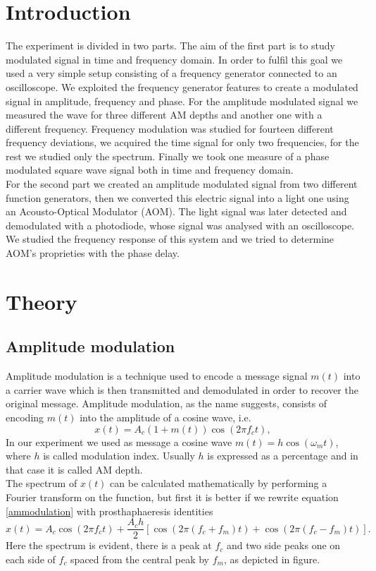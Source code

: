 \documentclass[a4paper,10pt]{article}
\begin{document}
\section{Introduction}
The experiment is divided in two parts. The aim of the first part is to study modulated signal in time and frequency domain. In order to fulfil this goal we used a very simple setup consisting of a frequency generator connected to an oscilloscope. We exploited the frequency generator features to create a modulated signal in amplitude, frequency and phase. 
For the amplitude modulated signal we measured the wave for three different AM depths and another one with a different frequency. Frequency modulation was studied for fourteen different frequency deviations, we acquired the time signal for only two frequencies, for the rest we studied only the spectrum. Finally we took one measure of a phase modulated square wave signal both in time and frequency domain.\\
For the second part we created an amplitude modulated signal from two different function generators, then we converted this electric signal into a light one using an Acousto-Optical Modulator (AOM). The light signal was later detected and demodulated with a photodiode, whose signal was analysed with an oscilloscope. We studied the frequency response of this system and we tried to determine AOM's proprieties with the phase delay.
\section{Theory}
\subsection{Amplitude modulation}
Amplitude modulation is a technique used to encode a message signal $m(t)$ into a carrier wave which is then transmitted and demodulated in order to recover the original message. Amplitude modulation, as the name suggests, consists of encoding $m(t)$ into the amplitude of a cosine wave, i.e.
\begin{equation}\label{ammodulation}x(t) = A_c (1+ m(t))\cos(2\pi f_c t),\end{equation}
In our experiment we used as message a cosine wave $m(t) = h\cos(\omega_m t)$, where $h$ is called modulation index. Usually $h$ is expressed as a percentage and in that case it is called AM depth.\\
The spectrum of $x(t)$ can be calculated mathematically by performing a Fourier transform on the function, but first it is better if we rewrite equation \eqref{ammodulation} with prosthaphaeresis identities
\[x(t) = A_c \cos(2\pi f_c t) + \frac{A_ch}{2}\left[\cos(2\pi(f_c + f_m)t)+\cos(2\pi(f_c - f_m)t)\right].\]
Here the spectrum is evident, there is a peak at $f_c$ and two side peaks one on each side of $f_c$ spaced from the central peak by $f_m$, as depicted in figure.
\end{document}
